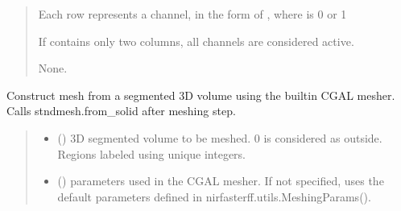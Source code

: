 \documentclass[letterpaper,10pt,english]{sphinxmanual}
\begin{document}
\begin{fulllineitems}
\begin{fulllineitems}
\begin{quote}
\begin{description}
\begin{itemize}
\sphinxAtStartPar
Each row represents a channel, in the form of , where  is 0 or 1

\sphinxAtStartPar
If  contains only two columns, all channels are considered active.


\end{itemize}

\sphinxAtStartPar
None.

\end{description}\end{quote}

\end{fulllineitems}


\begin{fulllineitems}
\label{\detokenize{_autosummary/nirfasterff.base.stnd_mesh.stndmesh:nirfasterff.base.stnd_mesh.stndmesh.from_volume}}
\pysigstartsignatures
\pysiglinewithargsret
{}
{\sphinxparamcomma {}\sphinxparamcomma {}\sphinxparamcomma {}\sphinxparamcomma {}\sphinxparamcomma {}}
{}
\pysigstopsignatures
\sphinxAtStartPar
Construct mesh from a segmented 3D volume using the built\sphinxhyphen{}in CGAL mesher. Calls stndmesh.from\_solid after meshing step.
\begin{quote}\begin{description}
\begin{itemize}
\item {} 
\sphinxAtStartPar
{} () \textendash{} 3D segmented volume to be meshed. 0 is considered as outside. Regions labeled using unique integers.

\item {} 
\sphinxAtStartPar
{} ({\hyperref[\detokenize{_autosummary/nirfasterff.utils.MeshingParams:nirfasterff.utils.MeshingParams}]{}}\sphinxstyleliteralemphasis{\sphinxupquote{, }}) \textendash{} 
\sphinxAtStartPar
parameters used in the CGAL mesher. If not specified, uses the default parameters defined in nirfasterff.utils.MeshingParams().


\end{itemize}
\end{description}
\end{quote}
\end{fulllineitems}
\end{fulllineitems}
\end{document}
